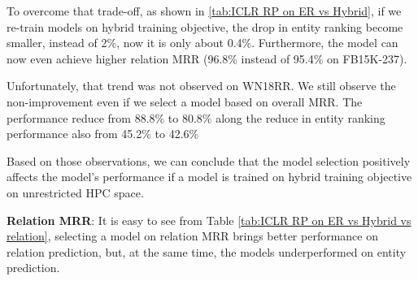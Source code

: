 To overcome that trade-off, as shown in \ref{tab:ICLR RP on ER vs Hybrid}, if we re-train models on hybrid training objective, the drop in entity ranking become smaller, instead of 2\%, now it is only about 0.4\%. Furthermore, the model can now even achieve higher relation MRR (96.8\% instead of 95.4\% on FB15K-237). 

Unfortunately, that trend was not observed on WN18RR. We still observe the non-improvement even if we select a model based on overall MRR. The performance reduce from 88.8\% to 80.8\% along the reduce in entity ranking performance also from 45.2\% to 42.6\%

Based on those observations, we can conclude that the model selection positively affects the model's performance if a model is trained on hybrid training objective on unrestricted HPC space. 
\newline

\noindent\textbf{Relation MRR}: It is easy to see from Table \ref{tab:ICLR RP on ER vs Hybrid vs relation}, selecting a model on relation MRR brings better performance on relation prediction, but, at the same time, the models underperformed on entity prediction.  

